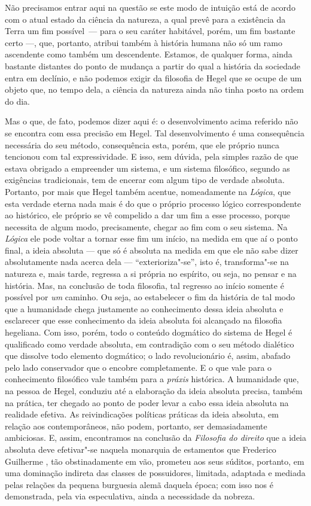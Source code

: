 Não precisamos entrar aqui na questão se este modo de intuição está de
acordo com o atual estado da ciência da natureza, a qual prevê para a
existência da Terra um fim possível~--- para o seu caráter
habitável, porém, um fim bastante certo ---, que, portanto, atribui também
à história humana não só um ramo ascendente como também um descendente.
Estamos, de qualquer forma, ainda bastante distantes do ponto de mudança
a partir do qual a história da sociedade entra em declínio, e não podemos
exigir da filosofia
de Hegel que
se ocupe de um objeto que, no tempo dela, a ciência da natureza ainda
não tinha posto na ordem do dia.

Mas o que, de fato, podemos dizer aqui é: o desenvolvimento acima
referido não se encontra com essa precisão
em Hegel.
Tal desenvolvimento é uma consequência necessária do seu método,
consequência esta, porém, que ele próprio nunca tencionou com tal
expressividade. E isso, sem dúvida, pela simples razão de que estava
obrigado a empreender um sistema, e um sistema filosófico, segundo as
exigências tradicionais, tem de encerar com algum tipo de verdade %
absoluta. Portanto, por mais que Hegel também acentue, nomeadamente
na \emph{Lógica}, que esta verdade eterna
nada mais é do que o próprio processo lógico correspondente ao
histórico, ele próprio se vê compelido a dar um fim a esse processo,
porque necessita de algum modo, precisamente, chegar ao fim com o seu
sistema. Na \emph{Lógica} ele pode voltar a tornar esse fim um início,
na medida em que aí o ponto final, a ideia absoluta --- que só é absoluta %
na medida em que ele não sabe dizer absolutamente nada acerca dela ---
``exterioriza"-se'', isto é, transforma"-se na 
natureza e, mais tarde, regressa a si própria no espírito, ou seja, no
pensar e na história. Mas, na conclusão de toda filosofia, tal regresso
ao início somente é possível por \emph{um} caminho. Ou seja, ao
estabelecer o fim da história de tal modo que a humanidade chega
justamente ao conhecimento dessa ideia absoluta \textbar{} e esclarecer que esse
conhecimento da ideia absoluta foi alcançado na filosofia hegeliana. \textbar{}
Com isso, porém, todo o conteúdo dogmático do sistema
de Hegel é
qualificado como verdade absoluta, em contradição com o seu método
dialético que dissolve todo elemento dogmático; o lado revolucionário é,
assim, abafado pelo lado conservador que o encobre completamente. E o
que vale para o conhecimento filosófico vale também para a
\emph{práxis} histórica. A humanidade que, na pessoa
de Hegel,
conduziu até a elaboração da ideia absoluta precisa, também na prática,
ter chegado ao ponto de poder levar a cabo essa ideia absoluta na
realidade efetiva. As reivindicações políticas práticas da ideia
absoluta, em relação aos contemporâneos, não podem, portanto, ser
demasiadamente ambiciosas. E, assim, encontramos na conclusão
da \emph{Filosofia do direito} que a ideia absoluta deve efetivar"-se
naquela monarquia de estamentos 
que Frederico Guilherme , tão obstinadamente em vão, prometeu aos seus súditos,
portanto, em uma dominação indireta das classes de possuidores,
limitada, adaptada e mediada pelas relações da pequena burguesia alemã
daquela época; com isso nos é demonstrada, pela via especulativa, ainda
a necessidade da nobreza.


